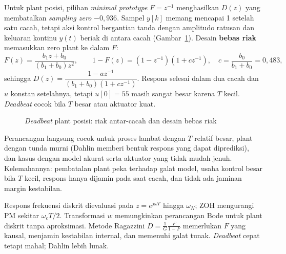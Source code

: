 \begin{contoh}
	Untuk plant posisi, pilihan \textit{minimal prototype} $F = z^{-1}$ menghasilkan $D(z)$ yang membatalkan \textit{sampling zero} $-0{,}936$. Sampel $y[k]$ memang mencapai 1 setelah satu cacah, tetapi aksi kontrol bergantian tanda dengan amplitudo ratusan dan keluaran kontinu $y(t)$ beriak di antara cacah (Gambar~\ref{fig:b9-ripple}). Desain \textbf{bebas riak} memasukkan zero plant ke dalam $F$:
	\[
		F(z) = \frac{b_1z + b_0}{(b_1+b_0)z^2},\qquad 1 - F(z) = (1 - z^{-1})(1 + cz^{-1}),\quad c = \frac{b_0}{b_1+b_0} = 0{,}483,
	\]
	sehingga $D(z) = \dfrac{1 - az^{-1}}{(b_1+b_0)(1 + cz^{-1})}$. Respons selesai dalam dua cacah dan $u$ konstan setelahnya, tetapi $u[0] = 55$ masih sangat besar karena $T$ kecil. \textit{Deadbeat} cocok bila $T$ besar atau aktuator kuat.
\end{contoh}

\begin{figure}[H]
	\centering
	\caption{\textit{Deadbeat} plant posisi: riak antar-cacah dan desain bebas riak}
	\label{fig:b9-ripple}
\end{figure}

Perancangan langsung cocok untuk proses lambat dengan $T$ relatif besar, plant dengan tunda murni (Dahlin memberi bentuk respons yang dapat diprediksi), dan kasus dengan model akurat serta aktuator yang tidak mudah jenuh. Kelemahannya: pembatalan plant peka terhadap galat model, usaha kontrol besar bila $T$ kecil, respons hanya dijamin pada saat cacah, dan tidak ada jaminan margin kestabilan.

\begin{ringkasan}
	Respons frekuensi diskrit dievaluasi pada $z = e^{j\omega T}$ hingga $\omega_N$; ZOH mengurangi PM sekitar $\omega_cT/2$. Transformasi $w$ memungkinkan perancangan Bode untuk plant diskrit tanpa aproksimasi. Metode Ragazzini $D = \frac{1}{G}\frac{F}{1-F}$ memerlukan $F$ yang kausal, menjamin kestabilan internal, dan memenuhi galat tunak. \textit{Deadbeat} cepat tetapi mahal; Dahlin lebih lunak.\\[3pt]
\end{ringkasan}

